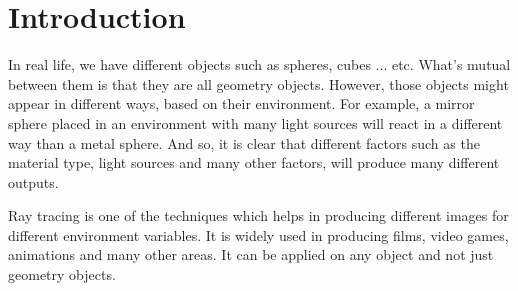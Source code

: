 \documentclass[a4paper]{report}
\begin{document}
	\chapter{Introduction}
	
	In real life, we have different objects such as spheres, cubes ... etc. What's mutual between them is that they are all geometry objects. However, those objects might appear in different ways, based on their environment. For example, a mirror sphere placed in an environment with many light sources will react in a different way than a metal sphere. And so, it is clear that different factors such as the material type, light sources and many other factors, will produce many different outputs. \\
	\par Ray tracing is one of the techniques which helps in producing different images for different environment variables. It is widely used in producing films, video games, animations and many other areas. It can be applied on any object and not just geometry objects.
\end{document}
